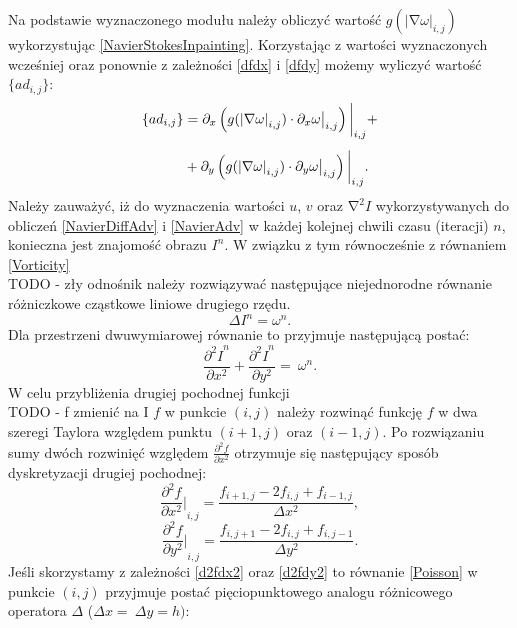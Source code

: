 \documentclass[12pt, twoside, openany]{report}
\theoremstyle{definition}
\begin{document}
Na podstawie wyznaczonego modułu należy obliczyć wartość $g{\left({\left|\mathrm{\nabla }\omega \right|}_{i,j}\right)}$ wykorzystując \eqref{NavierStokesInpainting}. Korzystając z wartości wyznaczonych wcześniej oraz ponownie z zależności \eqref{dfdx} i \eqref{dfdy} możemy wyliczyć wartość $\{ad_{i,j}\} $:
\begin{align}
\{ad_{i,j}\} &= \partial_x \left( g(\left| \nabla\omega \right|_{i,j}) \cdot \partial_x \omega \big|_{i,j} \right) \bigg|_{i,j} \notag +\\[1ex]
&+ \partial_y \left( g(\left|\nabla\omega\right|_{i,j}) \cdot \partial_y \omega \big|_{i,j} \right)\bigg|_{i,j}.
\label{discreteAnisotropic}
\end{align}
Należy zauważyć, iż do wyznaczenia wartości $u$, $v$ oraz ${\mathrm{\nabla }}^2I$ wykorzystywanych do obliczeń \eqref{NavierDiffAdv} i \eqref{NavierAdv} w każdej kolejnej chwili czasu (iteracji) $n$, konieczna jest znajomość obrazu $I^n$. W związku z tym równocześnie z równaniem \eqref{Vorticity} \\TODO - zły odnośnik należy rozwiązywać następujące niejednorodne równanie różniczkowe cząstkowe liniowe drugiego rzędu.
\begin{equation}
\Delta I^n={\omega }^n
\label{Poisson}
.
\end{equation}
Dla przestrzeni dwuwymiarowej równanie to przyjmuje następującą postać:
\begin{equation}
\frac{{{\partial }^2I}^n}{\partial x^2}+\frac{{{\partial }^2I}^n}{\partial y^2}=\ \omega^n
\label{Poisson2D}
.
\end{equation}
W celu przybliżenia drugiej pochodnej funkcji \\TODO - f zmienić na I $f$ w punkcie $(i,j)$ należy rozwinąć funkcję $f$ w dwa szeregi Taylora względem punktu $(i+1,j)$ oraz $(i-1,j)$. Po rozwiązaniu sumy dwóch rozwinięć względem $\frac{{\partial }^2f}{\partial x^2}$ otrzymuje się następujący sposób dyskretyzacji drugiej pochodnej:
\begin{equation}
{\frac{{\partial }^2f}{\partial x^2}\bigg|}_{i,j}\mathrm{=}\frac{f_{i+1,j}-2f_{i,j}+f_{i-1,j}}{\Delta x^2}
\label{d2fdx2}
,
\end{equation}
\begin{equation}
{\frac{{\partial }^2f}{\partial y^2}\bigg|}_{i,j}\mathrm{=}\frac{f_{i,j+1}-2f_{i,j}+f_{i,j-1}}{\Delta y^2}
\label{d2fdy2}
.
\end{equation}
Jeśli skorzystamy z zależności \eqref{d2fdx2} oraz \eqref{d2fdy2} to równanie \eqref{Poisson} w punkcie $(i,j)$ przyjmuje postać pięciopunktowego analogu różnicowego operatora $\Delta $ ($\Delta x=\ \Delta y=h)$:
\end{document}
